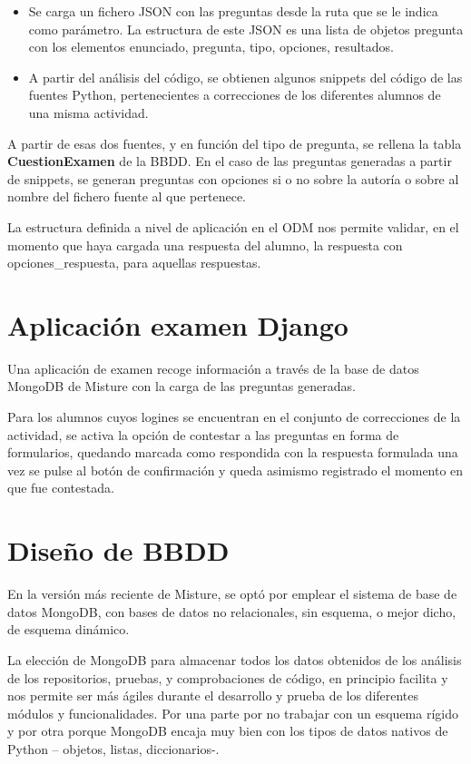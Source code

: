 \begin{itemize}
\item Se carga un fichero JSON con las preguntas desde la ruta que se le indica como parámetro. La estructura de este JSON es una lista de objetos pregunta con los elementos enunciado, pregunta, tipo, opciones, resultados.

\item A partir del análisis del código, se obtienen  algunos snippets del código de las fuentes Python, pertenecientes a correcciones de los diferentes alumnos de una misma actividad.
\end{itemize}


A partir de esas dos fuentes, y en función del tipo de pregunta, se rellena la tabla \textbf{CuestionExamen} de la BBDD. En el caso de las preguntas generadas a partir de snippets, se generan preguntas con opciones si o no sobre la autoría o sobre al nombre del fichero fuente al que pertenece.


La estructura definida a nivel de aplicación en el ODM nos permite validar, en el momento que haya cargada una respuesta del alumno, la respuesta con opciones\_respuesta, para aquellas respuestas.


\section{Aplicación examen Django}

Una aplicación de examen recoge información a través de la base de datos MongoDB de Misture con la carga de las preguntas generadas.


Para los alumnos cuyos logines se encuentran en el conjunto de correcciones de la actividad, se activa la opción de contestar a las preguntas en forma de formularios, quedando marcada como respondida con la respuesta formulada una vez se pulse al botón de confirmación y queda asimismo registrado el momento en que fue contestada.


\section{Diseño de BBDD} 
\label{sec:bbdd}
En la versión más reciente de Misture, se optó por emplear el sistema de base de datos MongoDB, con bases de datos no relacionales, sin esquema, o mejor dicho, de esquema dinámico.


La elección de MongoDB para almacenar todos los datos obtenidos de los análisis de los repositorios, pruebas, y comprobaciones de código, en principio facilita y nos permite ser más ágiles durante el desarrollo y prueba de los diferentes módulos y funcionalidades. Por una parte por no trabajar con un esquema rígido y por otra porque MongoDB encaja muy bien con los tipos de datos nativos de Python – objetos, listas, diccionarios-.


